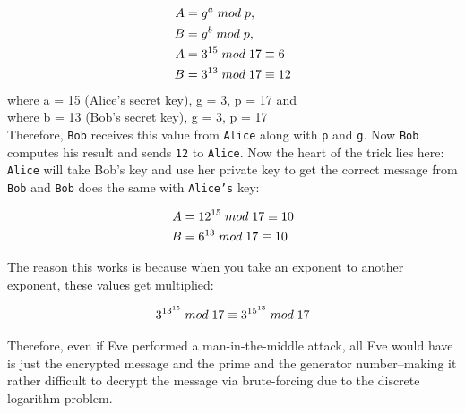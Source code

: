 \documentclass[10pt]{article}
\begin{document}
\begin{align*}
    A &= g^{a} \thickspace mod \thickspace p,  \\
    B &= g^{b} \thickspace mod \thickspace p,  \\
    A &= 3^{15} \thickspace mod \thickspace 17 \equiv 6 \\
    B &= 3^{13} \thickspace mod \thickspace 17 \equiv 12 \\
\end{align*}
where a = 15 (Alice's secret key), g = 3, p = 17 and \\
where b = 13 (Bob's secret key),   g = 3, p = 17 \\

Therefore, \texttt{Bob} receives this value from \texttt{Alice} along with
\texttt{p} and \texttt{g}. Now \texttt{Bob} computes his result and sends
\texttt{12} to \texttt{Alice}. Now the heart of the trick lies here:
\texttt{Alice} will take Bob's key and use her private key to get the correct
message from \texttt{Bob} and \texttt{Bob} does the same with \texttt{Alice's}
key:

\begin{align*}
    A &= 12^{15} \thickspace mod \thickspace 17 \equiv 10 \\
    B &= 6^{13} \thickspace  mod \thickspace 17 \equiv 10
\end{align*}

The reason this works is because when you take an exponent to another exponent, these values get
multiplied:

\begin{align*}
    3^{13^{15}} \thickspace mod \thickspace 17 \equiv 3^{15^{13}} \thickspace mod \thickspace 17
\end{align*}

Therefore, even if Eve performed a man-in-the-middle attack, all Eve would have
is just the encrypted message and the prime and the generator number--making it
rather difficult to decrypt the message via brute-forcing due to the discrete
logarithm problem.

\end{document}
